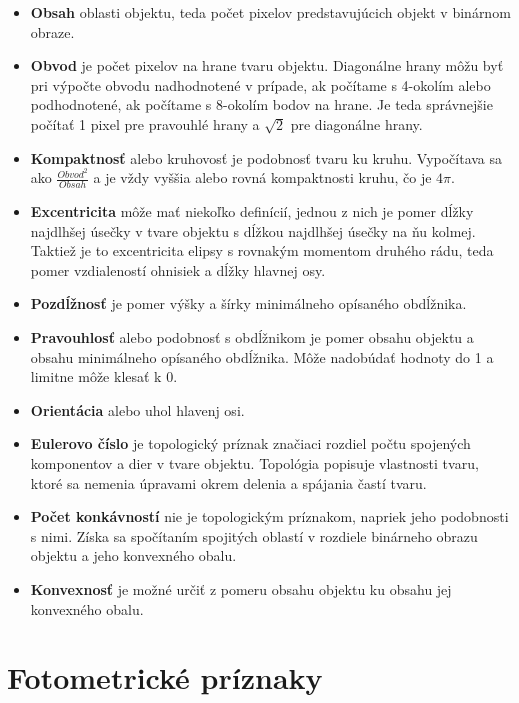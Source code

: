         \begin{itemize}
            \item \textbf{Obsah} oblasti objektu, teda počet pixelov predstavujúcich objekt v binárnom obraze.
            \item \textbf{Obvod} je počet pixelov na hrane tvaru objektu. Diagonálne hrany môžu byť pri výpočte obvodu nadhodnotené v prípade, ak počítame s 4-okolím alebo podhodnotené, ak počítame s 8-okolím bodov na hrane. Je teda správnejšie počítať 1 pixel pre pravouhlé hrany a \(\sqrt{2}\) pre diagonálne hrany.
            \item \textbf{Kompaktnosť} alebo kruhovosť je podobnosť tvaru ku kruhu. Vypočítava sa ako \(\frac{Obvod^2}{Obsah}\) a je vždy vyššia alebo rovná kompaktnosti kruhu, čo je \(4\pi\).
            \item \textbf{Excentricita} môže mať niekoľko definícií, jednou z nich je pomer dĺžky najdlhšej úsečky v tvare objektu s dĺžkou najdlhšej úsečky na ňu kolmej. Taktiež je to excentricita elipsy s rovnakým momentom druhého rádu, teda pomer vzdialeností ohnisiek a dĺžky hlavnej osy.
            \item \textbf{Pozdĺžnosť} je pomer výšky a šírky minimálneho opísaného obdĺžnika.
            \item \textbf{Pravouhlosť} alebo podobnosť s obdĺžnikom je pomer obsahu objektu a obsahu minimálneho opísaného obdĺžnika. Môže nadobúdať hodnoty do 1 a limitne môže klesať k 0.
            \item \textbf{Orientácia} alebo uhol hlavenj osi.
            \item \textbf{Eulerovo číslo} je topologický príznak značiaci rozdiel počtu spojených komponentov a dier v tvare objektu. Topológia popisuje vlastnosti tvaru, ktoré sa nemenia úpravami okrem delenia a spájania častí tvaru.
            \item \textbf{Počet konkávností} nie je topologickým príznakom, napriek jeho podobnosti s nimi. Získa sa spočítaním spojitých oblastí v rozdiele binárneho obrazu objektu a jeho konvexného obalu.
            \item \textbf{Konvexnosť} je možné určiť z pomeru obsahu objektu ku obsahu jej konvexného obalu.
        \end{itemize}

    \section{Fotometrické príznaky}

